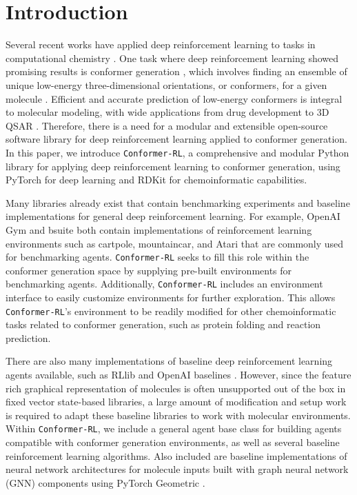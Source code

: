 \documentclass[twoside,11pt]{article}
\newcommand{\code}[1]{\texttt{#1}}
\newcommand{\titleofpaper}{Conformer-RL}
\newcommand{\genComment}[2]{\ifnum\comments=1{\color{#1}{\textsf{\footnotesize #2}}}\fi}
\newcommand{\ambuj}[1] {\genComment{red}{[AT: #1]}}
\newcommand{\tarun}[1] {\genComment{blue}{[TG: #1]}}
\newcommand{\runxuan}[1]{\genComment{pink}{[RJ:#1]}}
\begin{document}
\section{Introduction}
Several recent works have applied deep reinforcement learning to tasks in computational chemistry \citep{li2018foldingzero,zhou2017reactions,simm2020moldesign}. One task where deep reinforcement learning showed promising results is conformer generation \citep{gogineni2020torsionnet}, which involves finding an ensemble of unique low-energy three-dimensional orientations, or conformers, for a given molecule \citep{ebejer2020confgen}. Efficient and accurate prediction of low-energy conformers is integral to molecular modeling, with wide applications from drug development to 3D QSAR \citep{cole2018confgen}. Therefore, there is a need for a modular and extensible open-source software library for deep reinforcement learning applied to conformer generation.
In this paper, we introduce \code{\titleofpaper}, a comprehensive and modular Python library for applying deep reinforcement learning to conformer generation, using PyTorch \citep{torch} for deep learning and RDKit \ambuj{reference for RDKit?} for chemoinformatic capabilities.

Many libraries already exist that contain benchmarking experiments and baseline implementations for general deep reinforcement learning. For example, OpenAI Gym \citep{brockman2016gym} and bsuite \citep{osband2020bsuite} both contain implementations of reinforcement learning environments such as cartpole, mountaincar, and Atari that are commonly used for benchmarking agents. \code{\titleofpaper} seeks to fill this role within the conformer generation space by supplying pre-built environments for benchmarking agents. Additionally, \code{\titleofpaper} includes an environment interface to easily customize environments for further exploration. This allows \code{\titleofpaper}'s environment to be readily modified for other chemoinformatic tasks related to conformer generation, such as protein folding and reaction prediction.

There are also many implementations of baseline deep reinforcement learning agents available, such as RLlib \citep{liang2018rllib} and OpenAI baselines \citep{dhariwal2018baselines}. However, since the feature rich graphical representation of molecules is often unsupported out of the box in fixed vector state-based libraries, a large amount of modification and setup work is required to adapt these baseline libraries to work with molecular environments. Within \code{\titleofpaper}, we include a general agent base class for building agents compatible with conformer generation environments, as well as several baseline reinforcement learning algorithms. Also included are baseline implementations of neural network architectures for molecule inputs built with graph neural network (GNN) components using PyTorch Geometric \citep{fey2019geometric}.
\end{document}
